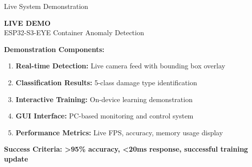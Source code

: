 \documentclass[aspectratio=169]{beamer}
\begin{document}
\begin{frame}{Live System Demonstration}
\begin{center}
{\Huge \textcolor{umblue}{\textbf{LIVE DEMO}}}\\
\vspace{1cm}
{\Large ESP32-S3-EYE Container Anomaly Detection}
\end{center}

\vspace{0.5cm}
\textbf{Demonstration Components:}
\begin{enumerate}
\item \textbf{Real-time Detection:} Live camera feed with bounding box overlay
\item \textbf{Classification Results:} 5-class damage type identification
\item \textbf{Interactive Training:} On-device learning demonstration
\item \textbf{GUI Interface:} PC-based monitoring and control system
\item \textbf{Performance Metrics:} Live FPS, accuracy, memory usage display
\end{enumerate}

\vspace{0.5cm}
\begin{center}
\textcolor{umblue}{\textbf{Success Criteria: >95\% accuracy, <20ms response, successful training update}}
\end{center}
\end{frame}
\end{document}
